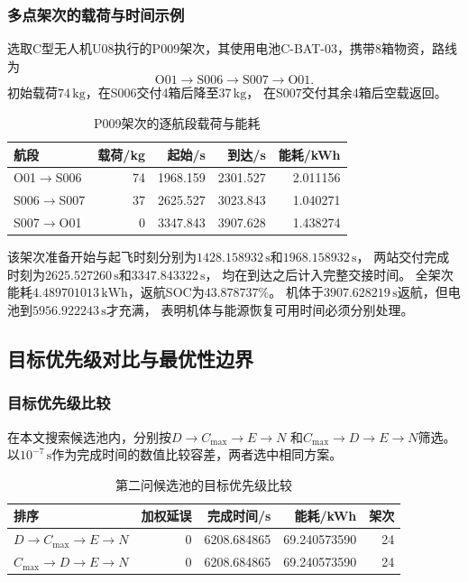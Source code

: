 \documentclass[bwprint]{gmcmthesis}
\begin{document}
\subsubsection{多点架次的载荷与时间示例}
选取C型无人机U08执行的P009架次，其使用电池C-BAT-03，携带8箱物资，路线为
\begin{equation}
\mathrm{O01}\rightarrow\mathrm{S006}\rightarrow\mathrm{S007}\rightarrow\mathrm{O01}.
\end{equation}
初始载荷$74\,\mathrm{kg}$，在S006交付4箱后降至$37\,\mathrm{kg}$，
在S007交付其余4箱后空载返回。
\begin{table}[htbp]
\centering
\small
\caption{P009架次的逐航段载荷与能耗}
\label{tab:q2_multistop}
\begin{tabular}{lrrrr}
\toprule
航段 & 载荷/kg & 起始/s & 到达/s & 能耗/kWh \\
\midrule
O01$\rightarrow$S006 & 74 & 1968.159 & 2301.527 & 2.011156 \\
S006$\rightarrow$S007 & 37 & 2625.527 & 3023.843 & 1.040271 \\
S007$\rightarrow$O01 & 0 & 3347.843 & 3907.628 & 1.438274 \\
\bottomrule
\end{tabular}
\end{table}

该架次准备开始与起飞时刻分别为$1428.158932\,\mathrm{s}$和$1968.158932\,\mathrm{s}$，
两站交付完成时刻为$2625.527260\,\mathrm{s}$和$3347.843322\,\mathrm{s}$，
均在到达之后计入完整交接时间。
全架次能耗$4.489701013\,\mathrm{kWh}$，返航SOC为$43.878737\%$。
机体于$3907.628219\,\mathrm{s}$返航，但电池到$5956.922243\,\mathrm{s}$才充满，
表明机体与能源恢复可用时间必须分别处理。

\subsection{目标优先级对比与最优性边界}
\subsubsection{目标优先级比较}
在本文搜索候选池内，分别按$D\rightarrow C_{\max}\rightarrow E\rightarrow N$
和$C_{\max}\rightarrow D\rightarrow E\rightarrow N$筛选。
以$10^{-7}\,\mathrm{s}$作为完成时间的数值比较容差，两者选中相同方案。
\begin{table}[htbp]
\centering
\small
\caption{第二问候选池的目标优先级比较}
\label{tab:q2_priority}
\begin{tabular}{lrrrr}
\toprule
排序 & 加权延误 & 完成时间/s & 能耗/kWh & 架次 \\
\midrule
$D\to C_{\max}\to E\to N$ & 0 & 6208.684865 & 69.240573590 & 24 \\
$C_{\max}\to D\to E\to N$ & 0 & 6208.684865 & 69.240573590 & 24 \\
\bottomrule
\end{tabular}
\end{table}
\end{document}
